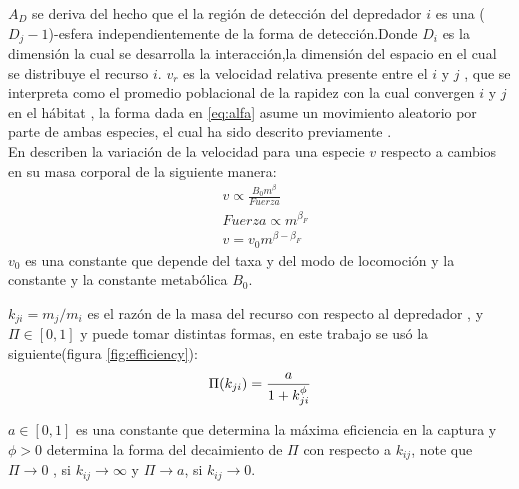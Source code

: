 $A_D$ se deriva del hecho que el la regi\'on de detecci\'on del depredador $i$ es una ($D_j-1$)-esfera independientemente de la forma de detecci\'on\citep{pawar2012dimensionality}.Donde $D_i$ es la dimensi\'on la cual se desarrolla la interacci\'on,la dimensi\'on del espacio en el cual se distribuye el recurso $i$.
$v_r$ es la velocidad relativa presente entre el $i$ y $j$ , que se interpreta como el promedio poblacional de la rapidez con la cual convergen $i$ y $j$ en el h\'abitat \citep[supinfo.]{pawar2012dimensionality} , la forma dada en \eqref{eq:alfa} asume un movimiento aleatorio por parte de ambas especies, el cual ha sido descrito previamente \citep{okubo2001diffusion}.\\
En \cite{pawar2012dimensionality} describen la variaci\'on de la velocidad para una especie $v$ respecto a cambios en su masa corporal de la siguiente manera:
\begin{equation}\label{eq:vel}
\begin{aligned}
&v \propto \frac{B_0 m^\beta}{Fuerza}\\
&Fuerza \propto m^{\beta_F} \\
&v = v_0m^{\beta - \beta_F}
\end{aligned}
\end{equation}
$v_0$ es una constante que depende del taxa y del modo de locomoci\'on y la constante y la constante metab\'olica $B_0$.\\ 

$k_{ji}= m_j/m_i$ es el raz\'on de la masa del recurso con respecto al depredador , y $\Pi \in [0,1]$ y  puede tomar distintas formas\citep{weitz2006size}, en este trabajo se us\'o la siguiente(figura \ref{fig:efficiency}): 
\begin{equation}\label{eq:sr}
\Pi(k_{ji}) =\frac{a}{1+k_{ji}^\phi} \\
\end{equation}

$a \in [0,1] $ es una constante que determina la m\'axima eficiencia en la captura y $\phi > 0 $ determina la forma del decaimiento de $\Pi$ con respecto a $k_{ij}$, note que $\Pi \to 0$ , si $k_{ij} \to \infty$ y $\Pi \to a $, si $k_{ij} \to 0$.

